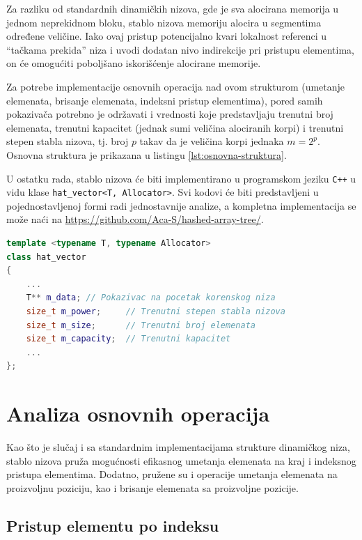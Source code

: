 \documentclass[a4paper]{article}
\begin{document}
Za razliku od standardnih dinamičkih nizova, gde je sva alocirana memorija u jednom neprekidnom bloku, stablo nizova memoriju alocira u segmentima određene veličine. Iako ovaj pristup potencijalno kvari lokalnost referenci u \enquote{tačkama prekida} niza i uvodi dodatan nivo indirekcije pri pristupu elementima, on će omogućiti poboljšano iskorišćenje alocirane memorije.

Za potrebe implementacije osnovnih operacija nad ovom strukturom (umetanje elemenata, brisanje elemenata, indeksni pristup elementima), pored samih pokazivača potrebno je održavati i vrednosti koje predstavljaju trenutni broj elemenata, trenutni kapacitet (jednak sumi veličina alociranih korpi) i trenutni stepen stabla nizova, tj. broj $p$ takav da je veličina korpi jednaka $m = 2^p$. Osnovna struktura je prikazana u listingu \ref{lst:osnovna-struktura}.

U ostatku rada, stablo nizova će biti implementirano u programskom jeziku \verb|C++| u vidu klase \verb|hat_vector<T, Allocator>|. Svi kodovi će biti predstavljeni u pojednostavljenoj formi radi jednostavnije analize, a kompletna implementacija se može naći na \url{https://github.com/Aca-S/hashed-array-tree/}.

\begin{lstlisting}[language=C++, caption={Osnovna struktura stabla nizova}, captionpos=b, label={lst:osnovna-struktura}]
template <typename T, typename Allocator>
class hat_vector
{
    ...
    T** m_data; // Pokazivac na pocetak korenskog niza
    size_t m_power;     // Trenutni stepen stabla nizova
    size_t m_size;      // Trenutni broj elemenata
    size_t m_capacity;  // Trenutni kapacitet
    ...
};
\end{lstlisting}

\section{Analiza osnovnih operacija}

Kao što je slučaj i sa standardnim implementacijama strukture dinamičkog niza, stablo nizova pruža mogućnosti efikasnog umetanja elemenata na kraj i indeksnog pristupa elementima. Dodatno, pružene su i operacije umetanja elemenata na proizvoljnu poziciju, kao i brisanje elemenata sa proizvoljne pozicije.

\subsection{Pristup elementu po indeksu}
\end{document}
